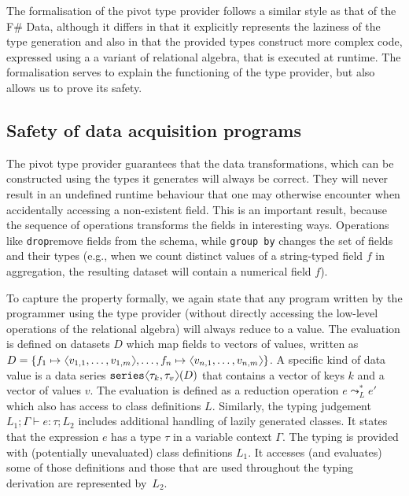 \documentclass[fleqn,11pt]{report}
\newcommand{\ident}[1]{\textnormal{\ttfamily #1}}
\newcommand{\langl}{\begin{picture}(4.5,7)
\put(1.1,2.5){\rotatebox{60}{\line(1,0){5.5}}}
\put(1.1,2.5){\rotatebox{300}{\line(1,0){5.5}}}
\end{picture}}
\newcommand{\rangl}{\begin{picture}(4.5,7)
\put(.9,2.5){\rotatebox{120}{\line(1,0){5.5}}}
\put(.9,2.5){\rotatebox{240}{\line(1,0){5.5}}}
\end{picture}}
\newcommand{\vect}[1]{\langl #1 \rangl}
\theoremstyle{definition}
\begin{document}
The formalisation of the pivot type provider follows a similar style as that of the F\# Data,
although it differs in that it explicitly represents the laziness of the type generation and
also in that the provided types construct more complex code, expressed using a a variant of
relational algebra, that is executed at runtime. The formalisation serves to explain the functioning
of the type provider, but also allows us to prove its safety.

\subsection{Safety of data acquisition programs}

The pivot type provider guarantees that the data transformations, which can be constructed using
the types it generates  will always be correct. They will never result in an undefined runtime
behaviour that one may otherwise encounter when accidentally accessing a non-existent field. This is
an important result, because the sequence of operations transforms the fields in interesting ways.
Operations like \texttt{drop}remove fields from the schema, while \texttt{group by} changes the set
of fields and their types (e.g., when we count distinct values of a string-typed field $f$ in aggregation,
the resulting dataset will contain a numerical field $f$).

To capture the property formally, we again state that any program written by the programmer using
the type provider (without directly accessing the low-level operations of the relational algebra)
will always reduce to a value. The evaluation is defined on datasets $D$ which
map fields to vectors of values, written as $D =
\{ f_1\mapsto\vect{v_{1,1},\ldots,v_{1,m}}, \ldots, f_n\mapsto\vect{v_{n,1},\ldots,v_{n,m}} \}$.
A specific kind of data value is a data series $\ident{series}\langl\tau_k,\tau_v\rangl(D)$ that
contains a vector of keys $k$ and a vector of values $v$. The evaluation is defined as a reduction
operation $e \leadsto_{L}^{*} e'$ which also has access to class definitions $L$.
Similarly, the typing judgement $L_1;\Gamma \vdash e : \tau; L_2$ includes additional handling of
lazily generated classes. It states that the expression $e$ has a type $\tau$ in a variable context
$\Gamma$. The typing is provided with (potentially unevaluated) class definitions $L_1$. It
accesses (and evaluates) some of those definitions and those that are used throughout the typing
derivation are represented by~$L_2$.
\end{document}
